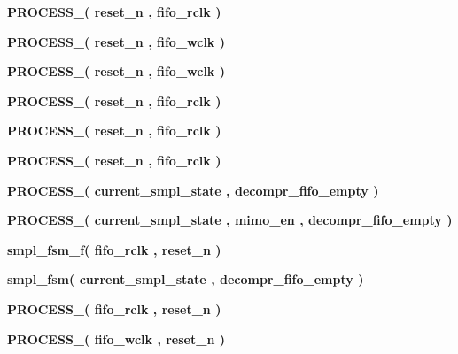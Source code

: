 \begin{DoxyCompactItemize}
\item 
{\bf P\+R\+O\+C\+E\+S\+S\+\_}{\bfseries  ( {\bfseries {\bfseries {\bf reset\+\_\+n}} \textcolor{vhdlchar}{ }} , {\bfseries {\bfseries {\bf fifo\+\_\+rclk}} \textcolor{vhdlchar}{ }} )}
\item 
{\bf P\+R\+O\+C\+E\+S\+S\+\_}{\bfseries  ( {\bfseries {\bfseries {\bf reset\+\_\+n}} \textcolor{vhdlchar}{ }} , {\bfseries {\bfseries {\bf fifo\+\_\+wclk}} \textcolor{vhdlchar}{ }} )}
\item 
{\bf P\+R\+O\+C\+E\+S\+S\+\_}{\bfseries  ( {\bfseries {\bfseries {\bf reset\+\_\+n}} \textcolor{vhdlchar}{ }} , {\bfseries {\bfseries {\bf fifo\+\_\+wclk}} \textcolor{vhdlchar}{ }} )}
\item 
{\bf P\+R\+O\+C\+E\+S\+S\+\_}{\bfseries  ( {\bfseries {\bfseries {\bf reset\+\_\+n}} \textcolor{vhdlchar}{ }} , {\bfseries {\bfseries {\bf fifo\+\_\+rclk}} \textcolor{vhdlchar}{ }} )}
\item 
{\bf P\+R\+O\+C\+E\+S\+S\+\_}{\bfseries  ( {\bfseries {\bfseries {\bf reset\+\_\+n}} \textcolor{vhdlchar}{ }} , {\bfseries {\bfseries {\bf fifo\+\_\+rclk}} \textcolor{vhdlchar}{ }} )}
\item 
{\bf P\+R\+O\+C\+E\+S\+S\+\_}{\bfseries  ( {\bfseries {\bfseries {\bf reset\+\_\+n}} \textcolor{vhdlchar}{ }} , {\bfseries {\bfseries {\bf fifo\+\_\+rclk}} \textcolor{vhdlchar}{ }} )}
\item 
{\bf P\+R\+O\+C\+E\+S\+S\+\_}{\bfseries  ( {\bfseries {\bfseries {\bf current\+\_\+smpl\+\_\+state}} \textcolor{vhdlchar}{ }} , {\bfseries {\bfseries {\bf decompr\+\_\+fifo\+\_\+empty}} \textcolor{vhdlchar}{ }} )}
\item 
{\bf P\+R\+O\+C\+E\+S\+S\+\_}{\bfseries  ( {\bfseries {\bfseries {\bf current\+\_\+smpl\+\_\+state}} \textcolor{vhdlchar}{ }} , {\bfseries {\bfseries {\bf mimo\+\_\+en}} \textcolor{vhdlchar}{ }} , {\bfseries {\bfseries {\bf decompr\+\_\+fifo\+\_\+empty}} \textcolor{vhdlchar}{ }} )}
\item 
{\bf smpl\+\_\+fsm\+\_\+f}{\bfseries  ( {\bfseries {\bfseries {\bf fifo\+\_\+rclk}} \textcolor{vhdlchar}{ }} , {\bfseries {\bfseries {\bf reset\+\_\+n}} \textcolor{vhdlchar}{ }} )}
\item 
{\bf smpl\+\_\+fsm}{\bfseries  ( {\bfseries {\bfseries {\bf current\+\_\+smpl\+\_\+state}} \textcolor{vhdlchar}{ }} , {\bfseries {\bfseries {\bf decompr\+\_\+fifo\+\_\+empty}} \textcolor{vhdlchar}{ }} )}
\item 
{\bf P\+R\+O\+C\+E\+S\+S\+\_}{\bfseries  ( {\bfseries {\bfseries {\bf fifo\+\_\+rclk}} \textcolor{vhdlchar}{ }} , {\bfseries {\bfseries {\bf reset\+\_\+n}} \textcolor{vhdlchar}{ }} )}
\item 
{\bf P\+R\+O\+C\+E\+S\+S\+\_}{\bfseries  ( {\bfseries {\bfseries {\bf fifo\+\_\+wclk}} \textcolor{vhdlchar}{ }} , {\bfseries {\bfseries {\bf reset\+\_\+n}} \textcolor{vhdlchar}{ }} )}
\end{DoxyCompactItemize}
